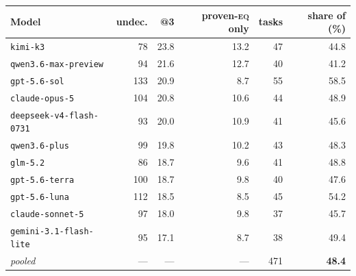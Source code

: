 \begin{tabular}{lrrrrr}
\toprule
Model & undec. & \usable{}@3 & proven-\textsc{eq} only & tasks & share of \usable{} (\%) \\
\midrule
\texttt{kimi-k3} & 78 & 23.8 & 13.2 & 47 & 44.8 \\
\texttt{qwen3.6-max-preview} & 94 & 21.6 & 12.7 & 40 & 41.2 \\
\texttt{gpt-5.6-sol} & 133 & 20.9 & 8.7 & 55 & 58.5 \\
\texttt{claude-opus-5} & 104 & 20.8 & 10.6 & 44 & 48.9 \\
\texttt{deepseek-v4-flash-0731} & 93 & 20.0 & 10.9 & 41 & 45.6 \\
\texttt{qwen3.6-plus} & 99 & 19.8 & 10.2 & 43 & 48.3 \\
\texttt{glm-5.2} & 86 & 18.7 & 9.6 & 41 & 48.8 \\
\texttt{gpt-5.6-terra} & 100 & 18.7 & 9.8 & 40 & 47.6 \\
\texttt{gpt-5.6-luna} & 112 & 18.5 & 8.5 & 45 & 54.2 \\
\texttt{claude-sonnet-5} & 97 & 18.0 & 9.8 & 37 & 45.7 \\
\texttt{gemini-3.1-flash-lite} & 95 & 17.1 & 8.7 & 38 & 49.4 \\
\midrule
\textit{pooled} & --- & --- & --- & 471 & \textbf{48.4} \\
\bottomrule
\end{tabular}

